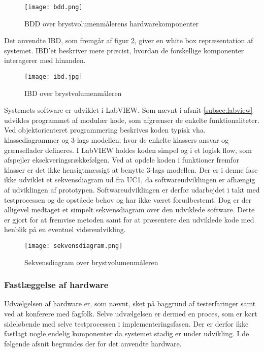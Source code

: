 \begin{figure}[htb]
\centering
\texttt{[image: bdd.png]}
\caption{BDD over brystvolumenmålerens hardwarekomponenter}
\label{fig:bdd}
\end{figure}

Det anvendte IBD, som fremgår af figur \ref{fig:ibd}, giver en white box repræsentation af systemet. IBD'et beskriver mere præcist, hvordan de forskellige komponenter interagerer med hinanden. 

\begin{figure}[htb]
\centering
\texttt{[image: ibd.jpg]}
\caption{IBD over brystvolumenmåleren}
\label{fig:ibd}
\end{figure}

Systemets software er udviklet i LabVIEW. Som nævnt i afsnit \ref{subsec:labview} udvikles programmet af modulær kode, som afgrænser de enkelte funktionaliteter. Ved objektorienteret programmering beskrives koden typisk vha. klassediagrammer og 3-lags modellen, hvor de enkelte klassers ansvar og grænseflader defineres. I LabVIEW holdes koden simpel og i et logisk flow, som afspejler eksekveringsrækkefølgen. Ved at opdele koden i funktioner fremfor klasser er det ikke hensigtmæssigt at benytte 3-lags modellen. 
Der er i denne fase ikke udviklet et sekvensdiagram ud fra UC1, da softwareudviklingen er afhængig af udviklingen af prototypen. Softwareudviklingen er derfor udarbejdet i takt med testprocessen og de opståede behov og har ikke været forudbestemt. Dog er der alligevel medtaget et simpelt sekvensdiagram over den udviklede software. Dette er gjort for at fremvise metoden samt for at præsentere den udviklede kode med henblik på en eventuel videreudvikling.

\begin{figure}[htb]
\centering
\texttt{[image: sekvensdiagram.png]}
\caption{Sekvensdiagram over brystvolumenmåleren}
\label{fig:sekvens}
\end{figure}

\subsubsection{Fastlæggelse af hardware} 
Udvælgelsen af hardware er, som nævnt, sket på baggrund af testerfaringer samt ved at konferere med fagfolk. Selve udvælgelsen er dermed en proces, som er kørt sideløbende med selve testprocessen i implementeringsfasen. Der er derfor ikke fastlagt nogle endelig komponenter da systemet stadig er under udvikling. I de følgende afsnit begrundes der for det anvendte hardware.  

